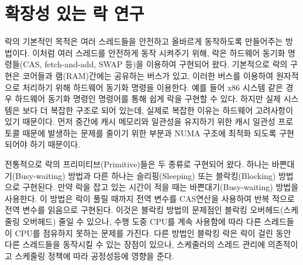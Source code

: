 \newpage
\section{확장성 있는 락 연구}
\label{sec:lockrelated}

락의 기본적인 목적은 여러 스레드들을 안전하고 올바르게 동작하도록 만들어주는 방법이다.
이처럼 여러 스레드를 안전하게 동작 시켜주기 위해, 락은 하드웨어 동기화 명령들(CAS,
fetch-and-add, SWAP 등)을 이용하여 구현되어 왔다. 
기본적으로 락의 구현은 코어들과 램(RAM)간에는 공유하는 버스가 있고, 이러한 버스를 이용하여 원자적으로 
처리하기 위해 하드웨어 동기화 명령을 이용한다. 
예를 들어 x86 시스템 같은 경우 하드웨어 동기화 명령인  명령어를 통해 쉽게 락을 구현할 수 있다.
하지만 실제 시스템은 보다 더 복잡한 구조로 되어 있는데, 
실제로 복잡한 이유는 하드웨어 고려사항이 있기 때문이다. 
먼저 중간에 캐시 메모리와 일관성을 유지하기 위한 캐시 일관성 
프로토콜 때문에 발생하는 문제를 줄이기 위한 부분과 NUMA 구조에 최적화 되도록 구현되어야 하기 때문이다.


전통적으로 락의 프리미티브(Primitive)들은 두 종류로 구현되어 왔다.
하나는 바쁜대기(Busy-waiting) 방법과 다른 하나는 슬리핑(Sleeping) 또는 블락킹(Blocking) 방법으로 구현된다.
만약 락을 잡고 있는 시간이 적을 때는 바쁜대기(Busy-waiting) 방법을 사용한다. 
이 방법은 락이 풀릴 때까지 전역 변수를 CAS연산을 사용하여 반복 적으로 전역 변수를 읽음으로 구현된다.
이것은 블락킹 방법의 문제점인 블락킹 오버헤드(스케줄링 오버헤드) 줄일 수 있으나, 
수행 도중 CPU를 계속 사용함에 따라 다른 스레드들이 CPU를 점유하지 못하는 문제를 가진다.
다른 방법인 블락킹 락은 락이 걸린 동안 다른 스레드들을 동작시킬 수 있는 장점이 있으나, 
스케줄러의 스레드 관리에 의존적이고 스케줄링 정책에 따라 공정성등에 영향을 준다.

